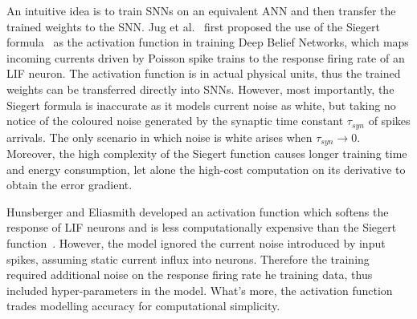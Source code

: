 \documentclass{article}
\begin{document}
An intuitive idea is to train SNNs on an equivalent ANN and then transfer the trained weights to the SNN.
Jug et al.~\cite{Jug_etal_2012} first proposed the use of the Siegert formula~\cite{siegert1951first} as the activation function in training Deep Belief Networks, which maps incoming currents driven by Poisson spike trains \texttt{}to the response firing rate of an LIF neuron.
The activation function is in actual physical units, thus the trained weights can be transferred directly into SNNs.
However, most importantly, the Siegert formula is inaccurate as it models current noise as white, but taking no notice of the coloured noise generated by the synaptic time constant $\tau_{syn}$ of spikes arrivals. The only scenario in which noise is  white arises when $\tau_{syn} \to 0$.
Moreover, the high complexity of the Siegert function causes longer training time and  energy consumption, let alone the high-cost computation on its derivative to obtain the error gradient.

Hunsberger and Eliasmith developed an activation function which softens the response of LIF neurons and is less computationally expensive than the Siegert function~\cite{hunsberger2015spiking}.
However, the model ignored the current noise introduced by input spikes, assuming static current influx into neurons.
Therefore the training required additional noise on the response firing rate he training data, thus included hyper-parameters in the model.
What's more, the activation function trades modelling accuracy for computational simplicity.
\end{document}

